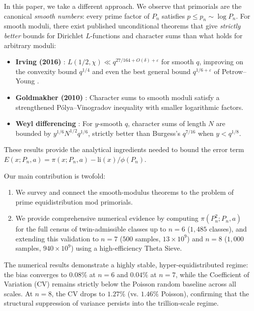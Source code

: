 \documentclass[11pt]{article}
\begin{document}
In this paper, we take a different approach. We observe that primorials are
the canonical \emph{smooth numbers}: every prime factor of $P_n$ satisfies
$p \leq p_n \sim \log P_n$. For smooth moduli, there exist published
unconditional theorems that give \emph{strictly better} bounds for Dirichlet
$L$-functions and character sums than what holds for arbitrary moduli:

\begin{itemize}
\item \textbf{Irving (2016)} \cite{irving2016}:
$L(1/2, \chi) \ll q^{27/164 + O(\delta) + \varepsilon}$ for smooth $q$,
improving on the convexity bound $q^{1/4}$ and even the best general bound
$q^{1/6 + \varepsilon}$ of Petrow--Young \cite{petrow2020}.
\item \textbf{Goldmakher (2010)} \cite{goldmakher2010}: Character sums to
smooth moduli satisfy a strengthened P\'{o}lya--Vinogradov inequality with
smaller logarithmic factors.
\item \textbf{Weyl differencing} \cite{tao2013}: For $y$-smooth $q$,
character sums of length $N$ are bounded by
$y^{1/6} N^{1/2} q^{1/6}$, strictly better than Burgess's
$q^{7/16}$ when $y < q^{1/8}$.
\end{itemize}

These results provide the analytical ingredients needed to bound the error
term $E(x; P_n, a) = \pi(x; P_n, a) - \mathrm{li}(x)/\phi(P_n)$.

Our main contribution is twofold:
\begin{enumerate}
\item We survey and connect the smooth-modulus theorems to the problem of
prime equidistribution mod primorials.
\item We provide comprehensive numerical evidence by computing
$\pi(P_n^2; P_n, a)$ for the full census of twin-admissible classes up to $n=6$ ($1{,}485$ classes), and extending this validation to $n=7$ ($500$ samples, $13 \times 10^9$) and $n=8$ ($1{,}000$ samples, $940 \times 10^9$) using a high-efficiency Theta Sieve.
\end{enumerate}

The numerical results demonstrate a highly stable, hyper-equidistributed regime: the bias converges to $0.08\%$ at $n=6$ and $0.04\%$ at $n=7$, while the Coefficient of Variation (CV) remains strictly below the Poisson random baseline across all scales. At $n=8$, the CV drops to $1.27\%$ (vs. $1.46\%$ Poisson), confirming that the structural suppression of variance persists into the trillion-scale regime.
\end{document}
